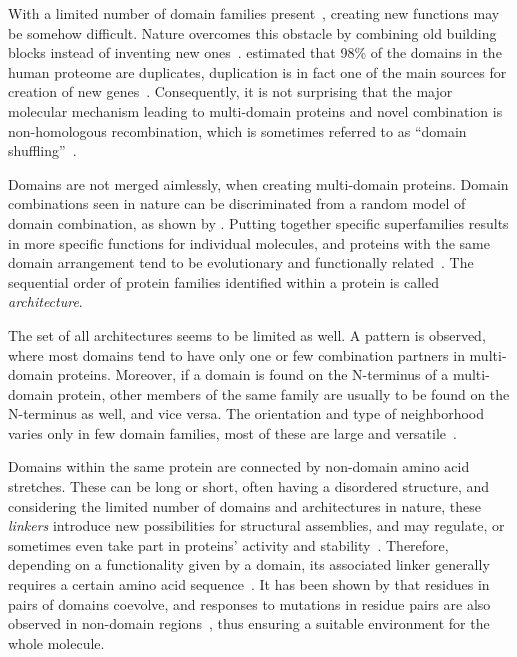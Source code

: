 \label{intro:multi}

  With a limited number of domain families
  present~\cite{chothia1992one, wolf2000estimating}, creating new functions may be somehow
  difficult.
  Nature overcomes this obstacle by combining old building blocks instead of inventing new
  ones~\cite{apic2001insight}.
  \citet{muller2002structural} estimated that 98\% of the domains in the human proteome
  are duplicates, duplication is in fact one of the main sources for creation of new
  genes~\cite{lynch2000evolutionary}.
  Consequently, it is not surprising that the major molecular mechanism leading to
  multi-domain proteins and novel combination is non-homologous recombination, which is
  sometimes referred to as ``domain shuffling''~\cite{vogel2004structure}.

  Domains are not merged aimlessly, when creating multi-domain proteins.
  Domain combinations seen in nature can be discriminated from a random model of domain
  combination, as shown by \citet{apic2003multi}.
  Putting together specific superfamilies results in more specific functions for
  individual molecules, and proteins with the same domain arrangement tend to be
  evolutionary and functionally
  related~\cite{hegyi2001annotation, bashton2002geometry, vogel2004structure}.
  The sequential order of protein families identified within a protein is called
  \emph{architecture}.

  The set of all architectures seems to be limited as well.
  A pattern is observed, where most domains tend to have only one or few
  combination partners in multi-domain proteins.
  Moreover, if a domain is found on the N-terminus of a multi-domain protein, other
  members of the same family are usually to be found on the N-terminus as well, and vice
  versa.
  The orientation and type of neighborhood varies only in few domain families, most of
  these are large and versatile~\cite{apic2001domain, apic2001insight}.

\label{intro:linker}

  Domains within the same protein are connected by non-domain amino acid stretches.
  These can be long or short, often having a disordered structure, and considering the
  limited number of domains and architectures in nature, these \emph{linkers} introduce
  new possibilities for structural assemblies, and may regulate, or sometimes even take
  part in proteins' activity and stability~\cite{papaleo2016role}.
  Therefore, depending on a functionality given by a domain, its associated linker
  generally requires a certain amino acid sequence~\cite{gokhale2000role}.
  It has been shown by \citet{jakubec2018widespread} that residues in pairs of domains
  coevolve, and responses to mutations in residue pairs are also observed in non-domain
  regions~\cite{smock2010interdomain}, thus ensuring a suitable environment for the whole
  molecule.

